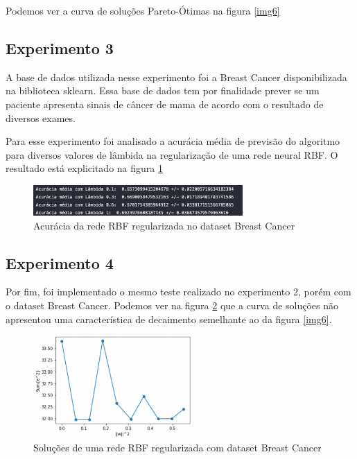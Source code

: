 Podemos ver a curva de soluções Pareto-Ótimas na figura \ref*{img6}



\subsection*{Experimento 3}

A base de dados utilizada nesse experimento foi a Breast Cancer disponibilizada na biblioteca sklearn. Essa base de dados tem por finalidade
prever se um paciente apresenta sinais de câncer de mama de acordo com o resultado de diversos exames.

Para esse experimento foi analisado a acurácia média de previsão do algoritmo para diversos valores de lâmbida na regularização de uma rede neural RBF.
O resultado está explicitado na figura \ref*{img7}

\begin{figure}[H]
    \center
    \includegraphics[width=8cm]{images/img7.png}
    \caption{\label{img7}Acurácia da rede RBF regularizada no dataset Breast Cancer}
\end{figure}




\subsection*{Experimento 4}

Por fim, foi implementado o mesmo teste realizado no experimento 2, porém com o dataset Breast Cancer.
Podemos ver na figura \ref*{img8} que a curva de soluções não apresentou uma característica de decaimento semelhante ao da figura \ref*{img6}.

\begin{figure}[H]
    \center
    \includegraphics[width=6cm]{images/img8.png}
    \caption{\label{img8}Soluções de uma rede RBF regularizada com dataset Breast Cancer}
\end{figure}


